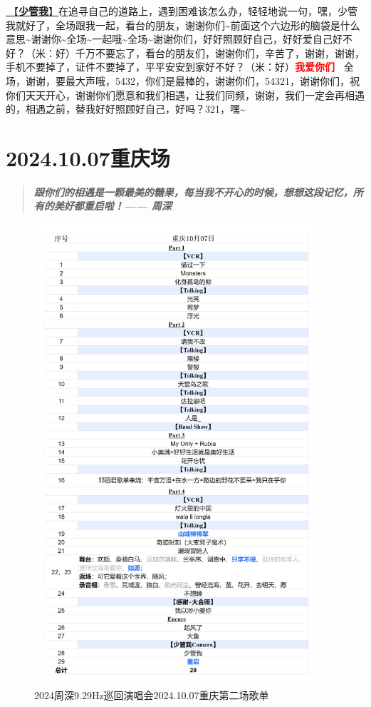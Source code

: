 \documentclass[]{ctexbook}
\begin{document}
\hyperref[watch-ur-manners]{🎵【\textbf{少管我}】}在追寻自己的道路上，遇到困难该怎么办，轻轻地说一句，嘿，少管我就好了，全场跟我一起，看台的朋友，谢谢你们\textasciitilde 前面这个六边形的脑袋是什么意思\textasciitilde 谢谢你\textasciitilde 全场\textasciitilde 一起哦\textasciitilde 全场\textasciitilde 谢谢你们，好好照顾好自己，好好爱自己好不好？（米：好）千万不要忘了，看台的朋友们，谢谢你们，辛苦了，谢谢，谢谢，手机不要掉了，证件不要掉了，平平安安到家好不好？（米：好）\textbf{\textcolor{red}{我爱你们~} } 全场，谢谢，要最大声哦，5432，你们是最棒的，谢谢你们，54321，谢谢你们，祝你们天天开心，谢谢你们愿意和我们相遇，让我们同频，谢谢，我们一定会再相遇的，相遇之前，替我好好照顾好自己，好吗？321，嘿\textasciitilde{}

\chapter{2024.10.07重庆场}\label{chongqing-20241007}

\begin{quote}
\textbf{\emph{跟你们的相遇是一颗最美的糖果，每当我不开心的时候，想想这段记忆，所有的美好都重启啦！------ 周深}}
\end{quote}

\begin{figure}

{\centering \includegraphics[width=300pt]{img/playlists/playlists-chongqing-20241007} 

}

\caption{2024周深9.29Hz巡回演唱会2024.10.07重庆第二场歌单}\label{fig:unnamed-chunk-107}
\end{figure}
\end{document}
